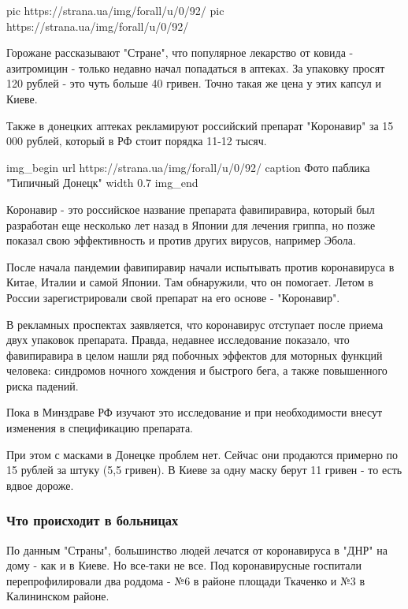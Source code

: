 \ifcmt
pic https://strana.ua/img/forall/u/0/92/%
pic https://strana.ua/img/forall/u/0/92/%
\fi

Горожане рассказывают "Стране", что популярное лекарство от ковида -
азитромицин - только недавно начал попадаться в аптеках. За упаковку просят 120
рублей - это чуть больше 40 гривен. Точно такая же цена у этих капсул и Киеве. 

Также в донецких аптеках рекламируют российский препарат "Коронавир" за 15 000
рублей, который в РФ стоит порядка 11-12 тысяч. 

\ifcmt
img_begin 
	url https://strana.ua/img/forall/u/0/92/%
	caption Фото паблика "Типичный Донецк" 
	width 0.7
img_end
\fi

Коронавир - это российское название препарата фавипиравира, который был
разработан еще несколько лет назад в Японии для лечения гриппа, но позже
показал свою эффективность и против других вирусов, например Эбола.

После начала пандемии фавипиравир начали испытывать против коронавируса в
Китае, Италии и самой Японии. Там обнаружили, что он помогает. Летом в России
зарегистрировали свой препарат на его основе - "Коронавир".

В рекламных проспектах заявляется, что коронавирус отступает после приема двух
упаковок препарата. Правда, недавнее исследование показало, что фавипиравира в
целом нашли ряд побочных эффектов для моторных функций человека: синдромов
ночного хождения и быстрого бега, а также повышенного риска падений.

Пока в Минздраве РФ изучают это исследование и при необходимости внесут
изменения в спецификацию препарата.

При этом с масками в Донецке проблем нет. Сейчас они продаются примерно по 15
рублей за штуку (5,5 гривен). В Киеве за одну маску берут 11 гривен - то есть
вдвое дороже.

\subsubsection{Что происходит в больницах}

По данным "Страны", большинство людей лечатся от коронавируса в "ДНР" на дому -
как и в Киеве. Но все-таки не все. Под коронавирусные госпитали
перепрофилировали два роддома - №6 в районе площади Ткаченко и №3 в Калининском
районе. 

